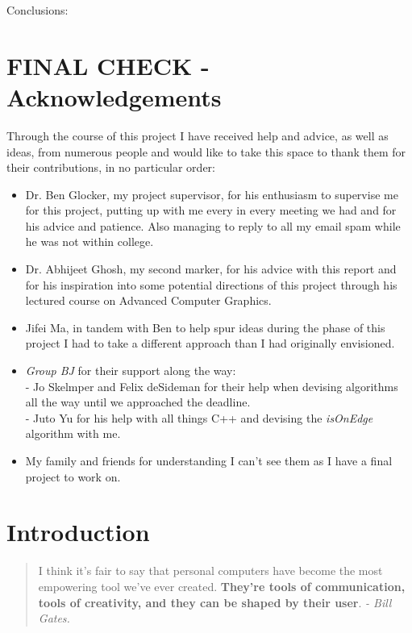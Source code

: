 \documentclass[11pt]{article}
\begin{document}
Conclusions:


\newpage
\section*{FINAL CHECK - Acknowledgements}
Through the course of this project I have received help and advice, as
well as ideas, from numerous people and would like to take this space
to thank them for their contributions, in no particular order:
\begin{itemize}
	\item Dr. Ben Glocker, my project supervisor, for his enthusiasm
		  to supervise me for this project, putting up with me every 
		  in every meeting we had and for his advice and patience. Also
		  managing to reply to all my email spam while he was not
		  within college.
	\item Dr. Abhijeet Ghosh, my second marker, for his advice with
		  this report and for his inspiration into some potential
		  directions of this project through his lectured course on
		  Advanced Computer Graphics.
	\item Jifei Ma, in tandem with Ben to help spur ideas during the
		  phase of this project I had to take a different approach than
		  I had originally envisioned.
	\item \textit{Group BJ} for their support along the way: \\
		  - Jo Skelmper and Felix deSideman for their help when devising
		  algorithms all the way until we approached the deadline.\\
		  - Juto Yu for his help with all things C++ and devising the
		  	\textit{isOnEdge} algorithm with me.
	\item My family and friends for understanding I can't see them as I
		  have a final project to work on.
\end{itemize}

\newpage
\tableofcontents
\newpage

\section{Introduction}
\begin{quote}
I think it's fair to say that personal computers have become
		the most empowering tool we've ever created. \textbf{They're tools of
		communication, tools of creativity, and they can be shaped by
		their user}. \textit{- Bill Gates.}		
\end{quote}
\end{document}
